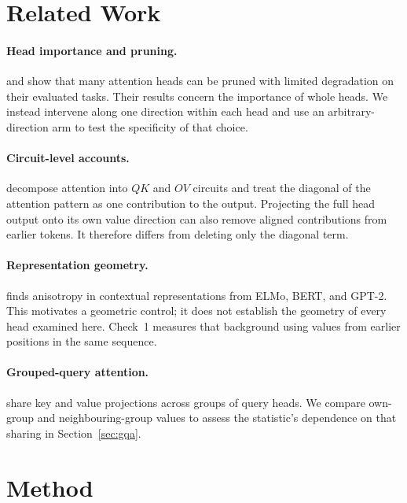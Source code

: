 \documentclass{article} %
\begin{document}
\section{Related Work}

\paragraph{Head importance and pruning.} \citet{michel2019sixteen} and
\citet{voita2019analyzing} show that many attention heads can be pruned with
limited degradation on their evaluated tasks. Their results concern the
importance of whole heads. We instead intervene along one direction within
each head and use an arbitrary-direction arm to test the specificity of that
choice.

\paragraph{Circuit-level accounts.} \citet{elhage2021mathematical} decompose
attention into $QK$ and $OV$ circuits and treat the diagonal of the attention
pattern as one contribution to the output. Projecting the full head output
onto its own value direction can also remove aligned contributions from
earlier tokens. It therefore differs from deleting only the diagonal term.

\paragraph{Representation geometry.} \citet{ethayarajh2019contextual} finds
anisotropy in contextual representations from ELMo, BERT, and GPT-2. This
motivates a geometric control; it does not establish the geometry of every
head examined here. Check~1 measures that background using values from
earlier positions in the same sequence.

\paragraph{Grouped-query attention.} \citet{ainslie2023gqa} share key and value
projections across groups of query heads. We compare own-group and
neighbouring-group values to assess the statistic's dependence on that sharing in
Section~\ref{sec:gqa}.

\section{Method}
\label{sec:method}
\end{document}
